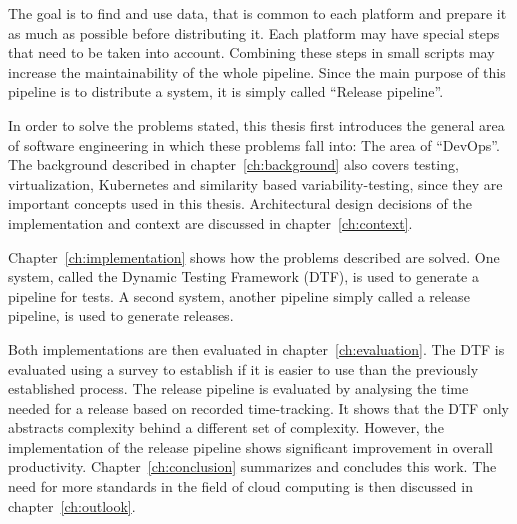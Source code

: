 The goal is to find and use data, that is common to each platform and prepare it as much as possible before distributing it.
Each platform may have special steps that need to be taken into account.
Combining these steps in small scripts may increase the maintainability of the whole pipeline.
Since the main purpose of this pipeline is to distribute a system, it is simply called ``Release pipeline''.

In order to solve the problems stated, this thesis first introduces the general area of software engineering in which these problems fall into: The area of ``DevOps''.
The background described in chapter~\ref{ch:background} also covers testing, virtualization, Kubernetes and similarity based variability-testing, since they are important concepts used in this thesis.
Architectural design decisions of the implementation and context are discussed in chapter~\ref{ch:context}.

Chapter~\ref{ch:implementation} shows how the problems described are solved.
One system, called the Dynamic Testing Framework (DTF), is used to generate a pipeline for tests.
A second system, another pipeline simply called a release pipeline, is used to generate releases.

\pagebreak

Both implementations are then evaluated in chapter~\ref{ch:evaluation}.
The DTF is evaluated using a survey to establish if it is easier to use than the previously established process.
The release pipeline is evaluated by analysing the time needed for a release based on recorded time-tracking.
It shows that the DTF only abstracts complexity behind a different set of complexity.
However, the implementation of the release pipeline shows significant improvement in overall productivity.
Chapter~\ref{ch:conclusion} summarizes and concludes this work.
The need for more standards in the field of cloud computing is then discussed in chapter~\ref{ch:outlook}.

